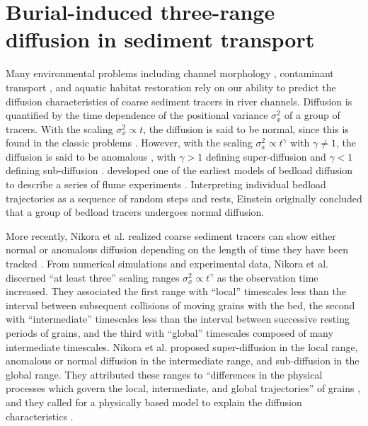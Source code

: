 
\chapter{Burial-induced three-range diffusion in sediment transport}
\label{ch:downDiff}

Many environmental problems including channel morphology \citep{Hassan2017}, contaminant transport \citep{Macklin2006}, and aquatic habitat restoration \citep{Gaeuman2017} rely on our ability to predict the diffusion characteristics of coarse sediment tracers in river channels.
Diffusion is quantified by the time dependence of the positional variance $\sigma_x^2$ of a group of tracers.
With the scaling $\sigma_x^2 \propto t$, the diffusion is said to be normal, since this is found in the classic problems \citep{Taylor1920}.
However, with the scaling $\sigma_x^2 \propto t^\gamma$ with $\gamma \neq 1$, the diffusion is said to be anomalous \citep{Sokolov2012}, with $\gamma>1$ defining super-diffusion and $\gamma<1$ defining sub-diffusion \citep{Metzler2000}.
\citet{Einstein1937} developed one of the earliest models of bedload diffusion to describe a series of flume experiments \citep{Ettema2004}.
Interpreting individual bedload trajectories as a sequence of random steps and rests, Einstein originally concluded that a group of bedload tracers undergoes normal diffusion.

More recently, Nikora et al. realized coarse sediment tracers can show either normal or anomalous diffusion depending on the length of time they have been tracked \citep{Nikora2001a,Nikora2002}.
From numerical simulations and experimental data, Nikora et al. discerned ``at least three'' scaling ranges $\sigma_x^2 \propto t^\gamma$ as the observation time increased.
They associated the first range with ``local'' timescales less than the interval between subsequent collisions of moving grains with the bed, the second with ``intermediate'' timescales less than the interval between successive resting periods of grains, and the third with ``global'' timescales composed of many intermediate timescales.
Nikora et al. proposed super-diffusion in the local range, anomalous or normal diffusion in the intermediate range, and sub-diffusion in the global range.
They attributed these ranges to ``differences in the physical processes which govern the local, intermediate, and global trajectories'' of grains \citep{Nikora2001a}, and they called for a physically based model to explain the diffusion characteristics \citep{Nikora2002}.


